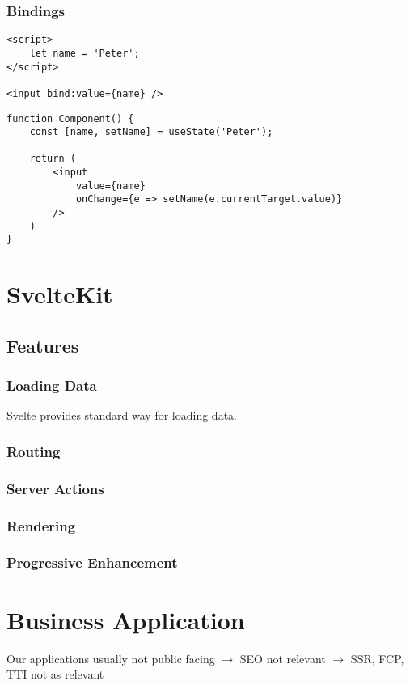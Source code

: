 \subsubsection{Bindings}


\begin{verbatim}
<script>
    let name = 'Peter';
</script>

<input bind:value={name} />
\end{verbatim}

\begin{verbatim}
function Component() {
    const [name, setName] = useState('Peter');

    return ( 
        <input 
            value={name}
            onChange={e => setName(e.currentTarget.value)} 
        />
    )
}
\end{verbatim}

\section{SvelteKit}
\label{sec:sveltekit}


\subsection{Features}

\subsubsection{Loading Data}

Svelte provides standard way for loading data.

\subsubsection{Routing}

\subsubsection{Server Actions}
 
\subsubsection{Rendering}

\subsubsection{Progressive Enhancement}

\section{Business Application}
\label{sec:business-application}

Our applications usually not public facing $\rightarrow$ SEO not relevant $\rightarrow$ SSR, FCP, TTI not as relevant

